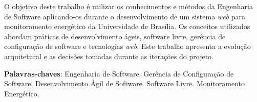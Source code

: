 \begin{resumo}
 O objetivo deste trabalho é utilizar os conhecimentos e métodos da Engenharia de Software aplicando-os durante o desenvolvimento de um sistema \textit{web} para monitoramento energético da Universidade de Brasília. Os conceitos utilizados abordam práticas de desenvolvimento ágeis, software livre, gerência de configuração de software e tecnologias \textit{web}. Este trabalho apresenta a evolução arquitetural e as decisões tomadas durante as iterações do projeto.

 \vspace{\onelineskip}
    
 \noindent
 \textbf{Palavras-chaves}: Engenharia de Software. Gerência de Configuração de Software. Desenvolvimento Ágil de Software. Software Livre. Monitoramento Energético.
\end{resumo}
